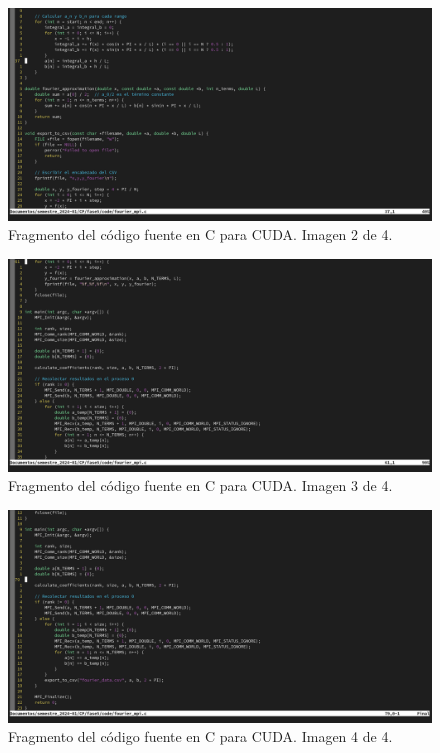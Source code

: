 \begin{figure}
	\includegraphics[width=\textwidth]{media/codigo_cuda_2.png}
	\caption{Fragmento del código fuente en C para CUDA. Imagen 2 de 4.}
	\label{img:codigo_cuda_2}
\end{figure}
\begin{figure}
	\includegraphics[width=\textwidth]{media/codigo_cuda_3.png}
	\caption{Fragmento del código fuente en C para CUDA. Imagen 3 de 4.}
	\label{img:codigo_cuda_3}
\end{figure}
\begin{figure}
	\includegraphics[width=\textwidth]{media/codigo_cuda_4.png}
	\caption{Fragmento del código fuente en C para CUDA. Imagen 4 de 4.}
	\label{img:codigo_cuda_4}
\end{figure}

